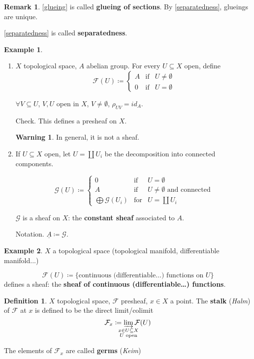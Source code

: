 \documentclass[12pt]{article}
\theoremstyle{definition}
\newtheorem*{definition}{Definition}
\newtheorem*{remark}{Remark}
\newtheorem*{warning}{Warning}
\newtheorem*{example}{Example}
\begin{document}
\begin{remark}
\ref{glueing} is called \textbf{glueing of sections}. By \ref{separatedness}, glueings are unique.

\ref{separatedness} is called \textbf{separatedness}.
\end{remark}

\begin{example}
\begin{enumerate}
\item $X$ topological space, $A$ abelian group. For every $U\subseteq X$ open, define
\[\mathcal{F}(U)\coloneqq\left\{\begin{array}{lll}A&\text{if}&U\neq\emptyset\\0&\text{if}&U=\emptyset\end{array}\right.\]

$\forall V\subseteq U$, $V,U$ open in $X$, $V\neq\emptyset$, $\rho_{UV}=id_A$.

Check. This defines a presheaf on $X$.

\begin{warning}
In general, it is not a sheaf.
\end{warning}

\item If $U\subseteq X$ open, let $U=\coprod U_i$ be the decomposition into connected components.

\[\mathcal{G}(U)\coloneqq\left\{\begin{array}{lll}0&\text{if}&U=\emptyset\\A&\text{if}&U\neq\emptyset\text{ and connected}\\\bigoplus\mathcal{G}(U_i)&\text{for}&U=\coprod U_i\end{array}\right.\]

$\mathcal{G}$ is a sheaf on $X$: the \textbf{constant sheaf} associated to $A$.

Notation. $\underline{A}\coloneqq\mathcal{G}$.
\end{enumerate}
\end{example}

\begin{example}
$X$ a topological space (topological manifold, differentiable manifold...)

\[\mathcal{F}(U)\coloneqq\{\text{continuous (differentiable\ldots) functions on }U\}\]
defines a sheaf: the \textbf{sheaf of continuous (differentiable\ldots) functions}.
\end{example}

\begin{definition}
$X$ topological space, $\mathcal{F}$ presheaf, $x\in X$ a point. The \textbf{stalk} (\emph{Halm}) of $\mathcal{F}$ at $x$ is defined to be the direct limit/colimit
\[\mathcal{F}_x\coloneqq\varinjlim_{\mathclap{\substack{x\in U\subseteq X\\U\text{ open}}}}\mathcal{F}(U)\]

The elements of $\mathcal{F}_x$ are called \textbf{germs} (\emph{Keim})
\end{definition}
\end{document}
